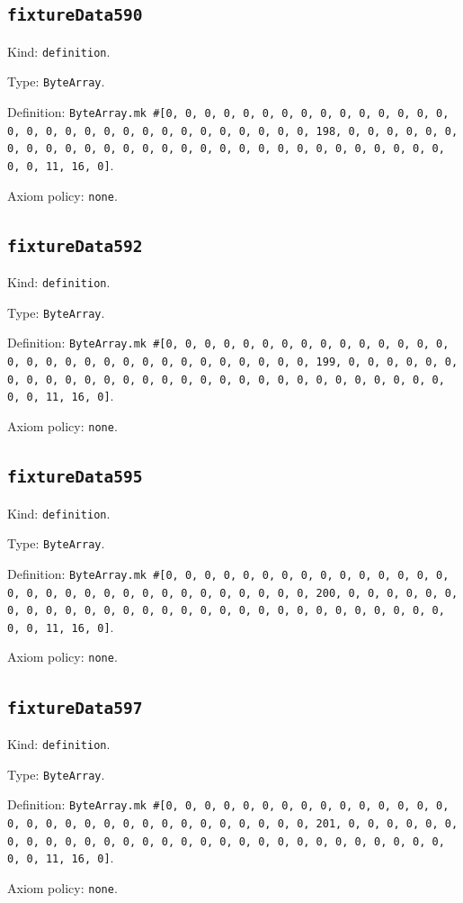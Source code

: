 \documentclass[11pt]{article}
\begin{document}
\subsection*{\texttt{fixtureData590}}
\noindent Kind: \texttt{definition}.\par
\noindent Type: \texttt{ByteArray}.\par
\noindent Definition: \texttt{ByteArray.mk \#[0, 0, 0, 0, 0, 0, 0, 0, 0, 0, 0, 0, 0, 0, 0, 0, 0, 0, 0, 0, 0, 0, 0, 0, 0, 0, 0, 0, 0, 0, 0, 198, 0, 0, 0, 0, 0, 0, 0, 0, 0, 0, 0, 0, 0, 0, 0, 0, 0, 0, 0, 0, 0, 0, 0, 0, 0, 0, 0, 0, 0, 0, 0, 11, 16, 0]}.\par
\noindent Axiom policy: \texttt{none}.\par
\subsection*{\texttt{fixtureData592}}
\noindent Kind: \texttt{definition}.\par
\noindent Type: \texttt{ByteArray}.\par
\noindent Definition: \texttt{ByteArray.mk \#[0, 0, 0, 0, 0, 0, 0, 0, 0, 0, 0, 0, 0, 0, 0, 0, 0, 0, 0, 0, 0, 0, 0, 0, 0, 0, 0, 0, 0, 0, 0, 199, 0, 0, 0, 0, 0, 0, 0, 0, 0, 0, 0, 0, 0, 0, 0, 0, 0, 0, 0, 0, 0, 0, 0, 0, 0, 0, 0, 0, 0, 0, 0, 11, 16, 0]}.\par
\noindent Axiom policy: \texttt{none}.\par
\subsection*{\texttt{fixtureData595}}
\noindent Kind: \texttt{definition}.\par
\noindent Type: \texttt{ByteArray}.\par
\noindent Definition: \texttt{ByteArray.mk \#[0, 0, 0, 0, 0, 0, 0, 0, 0, 0, 0, 0, 0, 0, 0, 0, 0, 0, 0, 0, 0, 0, 0, 0, 0, 0, 0, 0, 0, 0, 0, 200, 0, 0, 0, 0, 0, 0, 0, 0, 0, 0, 0, 0, 0, 0, 0, 0, 0, 0, 0, 0, 0, 0, 0, 0, 0, 0, 0, 0, 0, 0, 0, 11, 16, 0]}.\par
\noindent Axiom policy: \texttt{none}.\par
\subsection*{\texttt{fixtureData597}}
\noindent Kind: \texttt{definition}.\par
\noindent Type: \texttt{ByteArray}.\par
\noindent Definition: \texttt{ByteArray.mk \#[0, 0, 0, 0, 0, 0, 0, 0, 0, 0, 0, 0, 0, 0, 0, 0, 0, 0, 0, 0, 0, 0, 0, 0, 0, 0, 0, 0, 0, 0, 0, 201, 0, 0, 0, 0, 0, 0, 0, 0, 0, 0, 0, 0, 0, 0, 0, 0, 0, 0, 0, 0, 0, 0, 0, 0, 0, 0, 0, 0, 0, 0, 0, 11, 16, 0]}.\par
\noindent Axiom policy: \texttt{none}.\par
\end{document}
